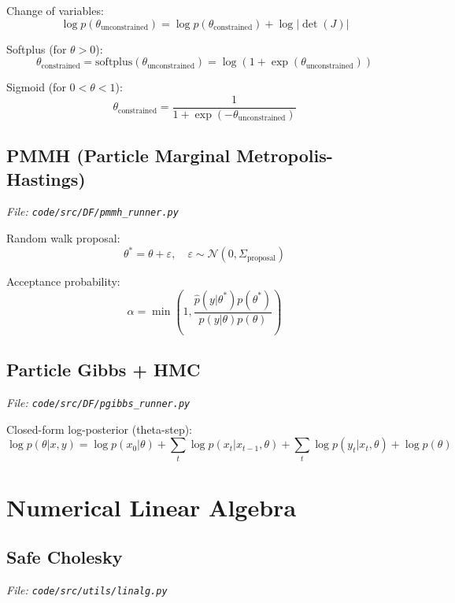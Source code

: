 \documentclass[12pt]{article}
\begin{document}
Change of variables:
\begin{equation}
\log p(\theta_{\text{unconstrained}}) = \log p(\theta_{\text{constrained}}) + \log|\det(J)|
\end{equation}

Softplus (for $\theta > 0$):
\begin{equation}
\theta_{\text{constrained}} = \text{softplus}(\theta_{\text{unconstrained}}) = \log(1 + \exp(\theta_{\text{unconstrained}}))
\end{equation}

Sigmoid (for $0 < \theta < 1$):
\begin{equation}
\theta_{\text{constrained}} = \frac{1}{1 + \exp(-\theta_{\text{unconstrained}})}
\end{equation}

\subsection{PMMH (Particle Marginal Metropolis-Hastings)}
\textit{File: \texttt{code/src/DF/pmmh\_runner.py}}

Random walk proposal:
\begin{equation}
\theta^* = \theta + \varepsilon, \quad \varepsilon \sim \mathcal{N}(0, \Sigma_{\text{proposal}})
\end{equation}

Acceptance probability:
\begin{equation}
\alpha = \min\left(1, \frac{\hat{p}(y|\theta^*) p(\theta^*)}{\hat{p}(y|\theta) p(\theta)}\right)
\end{equation}

\subsection{Particle Gibbs + HMC}
\textit{File: \texttt{code/src/DF/pgibbs\_runner.py}}

Closed-form log-posterior (theta-step):
\begin{equation}
\log p(\theta | x, y) = \log p(x_0 | \theta) + \sum_t \log p(x_t | x_{t-1}, \theta) + \sum_t \log p(y_t | x_t, \theta) + \log p(\theta)
\end{equation}

\section{Numerical Linear Algebra}

\subsection{Safe Cholesky}
\textit{File: \texttt{code/src/utils/linalg.py}}
\end{document}

